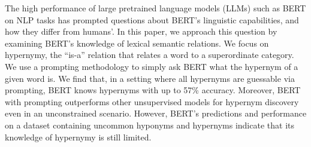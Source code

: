 The high performance of large pretrained language models (LLMs) such as BERT on NLP tasks has prompted questions about BERT's linguistic capabilities, and how they differ from humans'. In this paper, we approach this question by examining BERT's knowledge of lexical semantic relations. We focus on hypernymy, the ``is-a'' relation that relates a word to a superordinate category. We use a prompting methodology to simply ask BERT what the hypernym of a given word is. We find that, in a setting where all hypernyms are guessable via prompting, BERT knows hypernyms with up to 57\% accuracy. Moreover, BERT with prompting outperforms other unsupervised models for hypernym discovery even in an unconstrained scenario. However, BERT's predictions and performance on a dataset containing uncommon hyponyms and hypernyms indicate that its knowledge of hypernymy is still limited.
